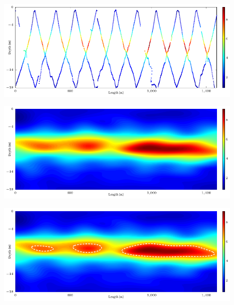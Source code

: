 \documentclass[10pt]{beamer}
\begin{document}
\begin{frame}
\begin{center}
\vspace{0.2in}
\includegraphics[width=4.7in]{figures/limno_bgape_sc}
\end{center}
\end{frame}

\begin{frame}
\begin{center}
\vspace{0.2in}
\includegraphics[width=4.7in]{figures/limno_bgape}
\end{center}
\end{frame}

\begin{frame}
\begin{center}
\vspace{0.2in}
\includegraphics[width=4.7in]{figures/limno_bgape_ls}
\end{center}
\end{frame}
\end{document}
